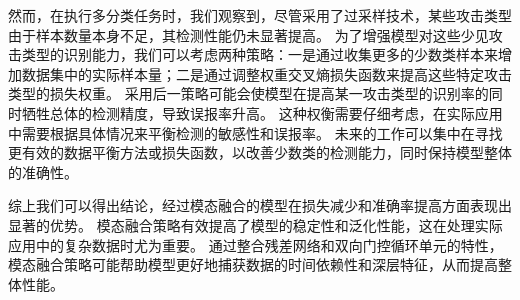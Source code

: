 然而，在执行多分类任务时，我们观察到，尽管采用了过采样技术，某些攻击类型由于样本数量本身不足，其检测性能仍未显著提高。
为了增强模型对这些少见攻击类型的识别能力，我们可以考虑两种策略：一是通过收集更多的少数类样本来增加数据集中的实际样本量；二是通过调整权重交叉熵损失函数来提高这些特定攻击类型的损失权重。
采用后一策略可能会使模型在提高某一攻击类型的识别率的同时牺牲总体的检测精度，导致误报率升高。
这种权衡需要仔细考虑，在实际应用中需要根据具体情况来平衡检测的敏感性和误报率。
未来的工作可以集中在寻找更有效的数据平衡方法或损失函数，以改善少数类的检测能力，同时保持模型整体的准确性。\par


综上我们可以得出结论，经过模态融合的模型在损失减少和准确率提高方面表现出显著的优势。
模态融合策略有效提高了模型的稳定性和泛化性能，这在处理实际应用中的复杂数据时尤为重要。
通过整合残差网络和双向门控循环单元的特性，模态融合策略可能帮助模型更好地捕获数据的时间依赖性和深层特征，从而提高整体性能。